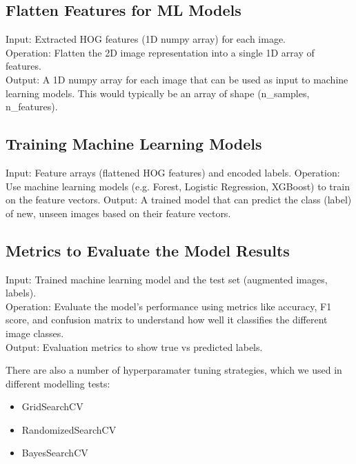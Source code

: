 \documentclass{article}
\begin{document}
\vspace{0.5cm}
    

\subsection{ Flatten Features for ML Models}\label{flatten_features}
Input: Extracted HOG features (1D numpy array) for each image.\\
Operation: Flatten the 2D image representation into a single 1D array of features.\\
Output: A 1D numpy array for each image that can be used as input to machine learning models. This would typically be an array of shape (n\_samples, n\_features).\\
\subsection{Training Machine Learning Models}\label{train_ML}
Input: Feature arrays (flattened HOG features) and encoded labels.
Operation: Use machine learning models (e.g. Forest, Logistic Regression, XGBoost) to train on the feature vectors.
Output: A trained model that can predict the class (label) of new, unseen images based on their feature vectors.

\subsection{Metrics to Evaluate the Model Results} \label{metrics_ML}
Input: Trained machine learning model and the test set (augmented images, labels).\\
Operation: Evaluate the model's performance using metrics like accuracy, F1 score, and confusion matrix to understand how well it classifies the different 
image classes.\\
Output: Evaluation metrics to show true vs predicted labels.


There are also a number of hyperparamater tuning strategies, which we used in different modelling tests:
\begin{itemize}
    \item GridSearchCV
    \item RandomizedSearchCV
    \item BayesSearchCV
\end{itemize}
\end{document}
